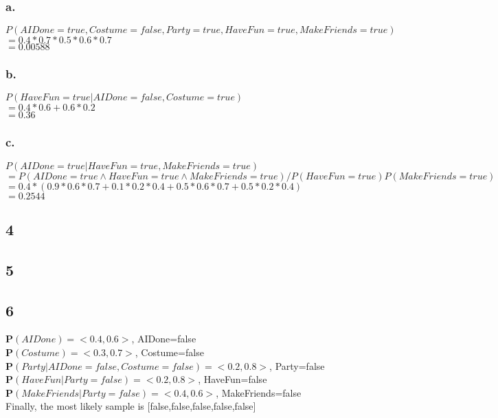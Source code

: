 \documentclass{article}
\begin{document}
            \subsubsection{a.}
                \par $P(AIDone=true,Costume=false,Party=true,HaveFun=true,MakeFriends=true)$
                \\$= 0.4*0.7*0.5*0.6*0.7$
                \\$= 0.00588$
            \subsubsection{b.}
                \par $P(HaveFun=true|AIDone=false,Costume=true)$
                \\$= 0.4*0.6+0.6*0.2$
                \\$= 0.36$
            \subsubsection{c.}
                \par $P(AIDone=true|HaveFun=true,MakeFriends=true)$
                \\$=P(AIDone=true\wedge HaveFun=true\wedge MakeFriends=true)/P(HaveFun=true)P(MakeFriends=true)$
                \\$=0.4*(0.9*0.6*0.7+0.1*0.2*0.4+0.5*0.6*0.7+0.5*0.2*0.4)$
                \\$=0.2544$
        \subsection{4}
        \subsection{5}
        \subsection{6}
            \textbf{P}$(AIDone)=<0.4,0.6>$, AIDone=false
            \\\textbf{P}$(Costume)=<0.3,0.7>$, Costume=false
            \\\textbf{P}$(Party|AIDone=false, Costume=false)=<0.2,0.8>$, Party=false
            \\\textbf{P}$(HaveFun|Party=false)=<0.2,0.8>$, HaveFun=false
            \\\textbf{P}$(MakeFriends|Party=false)=<0.4,0.6>$, MakeFriends=false
            \\Finally, the most likely sample is [false,false,false,false,false]
\end{document}
